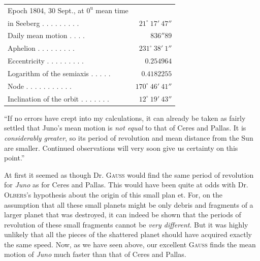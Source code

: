 \begin{center}
\begingroup\fontsize{9}{11}\selectfont\setlength{\tabcolsep}{3pt}\renewcommand{\arraystretch}{1.1}
\begin{tabular}{lr}
Epoch 1804, 30 Sept., at $0^{\mathrm u}$ mean time  &  \\
\quad in Seeberg . . . . . . . . . & $21^\circ\ 17'\ 47''$ \\
Daily mean motion . . . . & $836''89$ \\
Aphelion . . . . . . . . . & $231^\circ\ 38'\ 1''$ \\
Eccentricity . . . . . . . . . & $0.254964$ \\
Logarithm of the semiaxis . . . . . & $0.4182255$ \\
Node . . . . . . . . . . . & $170^\circ\ 46'\ 41''$ \\
Inclination of the orbit . . . . . . . & $12^\circ\ 19'\ 43''$ \\
\end{tabular}\endgroup
\end{center}


“If no errors have crept into my calculations, it can already be taken as fairly settled that Juno’s mean motion is \emph{not equal} to that of Ceres and Pallas. It is \emph{considerably greater}, so its period of revolution and mean distance from the Sun are smaller. Continued observations will very soon give us certainty on this point.”

At first it seemed as though Dr. \textsc{Gauss} would find the same period of revolution for \emph{Juno} as for Ceres and Pallas. This would have been quite at odds with Dr. \textsc{Olbers}’s hypothesis about the origin of this small plan%
%
et. For, on the assumption that all these small planets might be only debris and fragments of a larger planet that was destroyed, it can indeed be shown that the periods of revolution of these small fragments cannot be \emph{very different}. But it was highly unlikely that all the pieces of the shattered planet should have acquired exactly the same speed. Now, as we have seen above, our excellent \textsc{Gauss} finds the mean motion of \emph{Juno} much faster than that of Ceres and Pallas.

